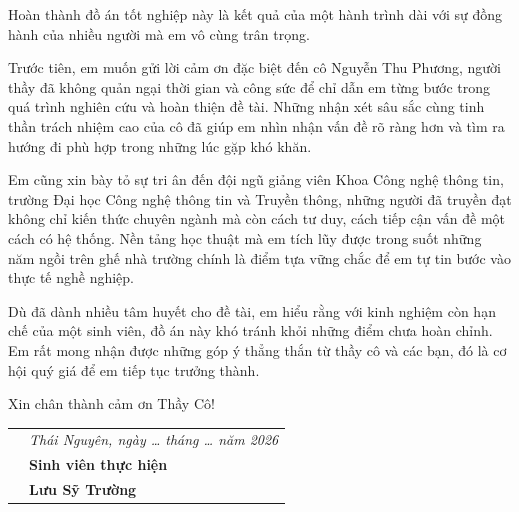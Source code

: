 \documentclass[../main.tex]{subfiles}
\begin{document}
Hoàn thành đồ án tốt nghiệp này là kết quả của một hành trình dài với sự đồng hành của nhiều người mà em vô cùng trân trọng.

Trước tiên, em muốn gửi lời cảm ơn đặc biệt đến cô Nguyễn Thu Phương, người thầy đã không quản ngại thời gian và công sức để chỉ dẫn em từng bước trong quá trình nghiên cứu và hoàn thiện đề tài. Những nhận xét sâu sắc cùng tinh thần trách nhiệm cao của cô đã giúp em nhìn nhận vấn đề rõ ràng hơn và tìm ra hướng đi phù hợp trong những lúc gặp khó khăn.

Em cũng xin bày tỏ sự tri ân đến đội ngũ giảng viên Khoa Công nghệ thông tin, trường Đại học Công nghệ thông tin và Truyền thông, những người đã truyền đạt không chỉ kiến thức chuyên ngành mà còn cách tư duy, cách tiếp cận vấn đề một cách có hệ thống. Nền tảng học thuật mà em tích lũy được trong suốt những năm ngồi trên ghế nhà trường chính là điểm tựa vững chắc để em tự tin bước vào thực tế nghề nghiệp.

Dù đã dành nhiều tâm huyết cho đề tài, em hiểu rằng với kinh nghiệm còn hạn chế của một sinh viên, đồ án này khó tránh khỏi những điểm chưa hoàn chỉnh. Em rất mong nhận được những góp ý thẳng thắn từ thầy cô và các bạn, đó là cơ hội quý giá để em tiếp tục trưởng thành.

Xin chân thành cảm ơn Thầy Cô!

\vspace{1cm}

\begin{tabular}{p{} >{\centering\arraybackslash}p{}}
	& \textit{Thái Nguyên, ngày \ldots{} tháng \ldots{} năm 2026} \\[0.5cm]
	& \textbf{Sinh viên thực hiện} \\[2cm]
	& \textbf{Lưu Sỹ Trường}
\end{tabular}
\end{document}
